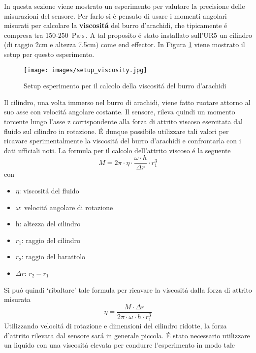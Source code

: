 In questa sezione viene mostrato un esperimento per valutare la precisione delle misurazioni del sensore\footnotemark{}. 
Per farlo si \'{e} pensato di usare i momenti angolari misurati per calcolare la \textbf{viscosit\'{a}} del burro d'arachidi, 
che tipicamente \'{e} compresa tra 150-250 $\text{Pa} \cdot \text{s}$. 
A tal proposito \'{e} stato installato sull'UR5 un cilindro (di raggio 2cm e altezza 7.5cm) come end effector. 
In Figura \ref{fig:peanut_butter} viene mostrato il setup per questo esperimento. 
\begin{figure}[H]
    \centering
    \texttt{[image: images/setup\_viscosity.jpg]}
    \caption{Setup esperimento per il calcolo della viscosit\'{a} del burro d'arachidi}
    \label{fig:peanut_butter}
\end{figure}
Il cilindro, una volta immerso nel burro di arachidi, viene fatto ruotare attorno al suo asse con velocit\'{a} angolare 
costante. Il sensore, rileva quindi un momento torcente lungo l'asse z corrispondente alla forza di attrito viscoso esercitata 
dal fluido sul cilindro in rotazione. \'{E} dunque possibile utilizzare tali valori per ricavare sperimentalmente 
la viscosit\'{a} del burro d'arachidi e confrontarla con i dati ufficiali noti. 
La formula per il calcolo dell'attrito viscoso \'{e} la seguente 
\begin{equation*}
    M = 2\pi \cdot \eta \cdot \frac{\omega \cdot h}{\Delta r} \cdot r_{1}^{3}
\end{equation*}
con 
\begin{itemize}
    \item $\eta$: viscosit\'{a} del fluido
    \item $\omega$: velocit\'{a} angolare di rotazione
    \item h: altezza del cilindro
    \item $r_{1}$: raggio del cilindro
    \item $r_{2}$: raggio del barattolo
    \item $\Delta r$: $r_{2} - r_{1}$
\end{itemize}
Si pu\'{o} quindi `ribaltare' tale formula per ricavare la viscosit\'{a} dalla forza di attrito misurata 
\begin{equation} \label{eq:eta}
    \eta = \frac{M \cdot \Delta r}{2\pi \cdot \omega \cdot h \cdot r_{1}^{3}}
\end{equation}
Utilizzando velocit\'{a} di rotazione e dimensioni del cilindro ridotte, la forza d'attrito rilevata dal sensore sar\'{a} in generale 
piccola. \'{E} stato necessario utilizzare un liquido con una viscosit\'{a} elevata per condurre l'esperimento in modo tale 
